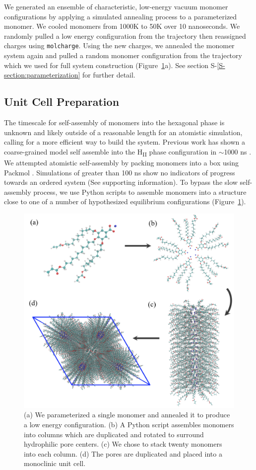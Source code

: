 \documentclass[journal=jpcbfk,manusciprt=article]{achemso}
\begin{document}
  We generated an ensemble of characteristic, low-energy vacuum monomer
  configurations by applying a simulated annealing process to a
  parameterized monomer. We cooled monomers from 1000K to 50K over 10
  nanoseconds. We randomly pulled a low energy configuration from the
  trajectory then reassigned charges using \texttt{molcharge}. Using the new
  charges, we annealed the monomer system again and pulled a random monomer
  configuration from the trajectory which we used for full system
  construction (Figure~\ref{fig:python}a). See section S-\ref{S-section:parameterization} 
  for further detail.

  \subsection{Unit Cell Preparation}

  The timescale for self-assembly of monomers into the hexagonal phase is
  unknown and likely outside of a reasonable length for an atomistic simulation,
  calling for a more efficient way to build the system. Previous work has shown
  a coarse-grained model self assemble into the H\textsubscript{II} phase
  configuration in $\sim$1000 ns \cite{mondal_self-assembly_2013}.  We
  attempted atomistic self-assembly by packing monomers into a box using Packmol
  \cite{martinez_packmol:_2009}. Simulations of greater than 100 ns show no
  indicators of progress towards an ordered system (See supporting information). 
  To bypass the slow self-assembly process, we use Python scripts to assemble monomers
  into a structure close to one of a number of hypothesized equilibrium configurations
  (Figure~\ref{fig:python}).
  
  \begin{figure}
	\centering
	\includegraphics[width=0.75\linewidth]{build.PNG} %
	\caption{(a) We parameterized a single monomer and annealed it to produce a low energy
		configuration. (b) A Python script assembles monomers into columns which are duplicated 
		and rotated to surround hydrophilic pore centers. (c) We chose to stack twenty monomers
		into each column. (d) The pores are duplicated and placed into a monoclinic unit cell.}\label{fig:python}
  \end{figure}
  
\end{document}
